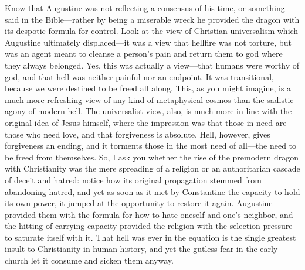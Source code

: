 Know that Augustine was not reflecting a consensus of his time, or something said in the Bible---rather by being a miserable wreck he provided the dragon with its despotic formula for control. Look at the view of Christian universalism \cite{Hanson2008-pf} which Augustine ultimately displaced---it was a view that hellfire was not torture, but was an agent meant to cleanse a person's pain and return them to god where they always belonged. Yes, this was actually a view---that humans were worthy of god, and that hell was neither painful nor an endpoint. It was transitional, because we were destined to be freed all along. This, as you might imagine, is a much more refreshing view of any kind of metaphysical cosmos than the sadistic agony of modern hell. The universalist view, also, is much more in line with the original idea of Jesus himself, where the impression was that those in need are those who need love, and that forgiveness is absolute. Hell, however, gives forgiveness an ending, and it torments those in the most need of all---the need to be freed from themselves. So, I ask you whether the rise of the premodern dragon with Christianity was the mere spreading of a religion or an authoritarian cascade of deceit and hatred: notice how its original propagation stemmed from abandoning hatred, and yet as soon as it met by Constantine the capacity to hold its own power, it jumped at the opportunity to restore it again. Augustine provided them with the formula for how to hate oneself and one's neighbor, and the hitting of carrying capacity provided the religion with the selection pressure to saturate itself with it. That hell was ever in the equation is the single greatest insult to Christianity in human history, and yet the gutless fear in the early church let it consume and sicken them anyway. 


